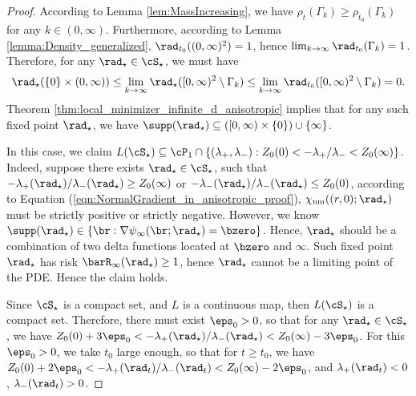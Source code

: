 \documentclass[11pt]{article}
\begin{document}
\begin{proof}
According to Lemma \ref{lem:MassIncreasing}, we have $\rho_t(\Gamma_k) \ge \rho_{t_0}(\Gamma_k)$ for any $k \in (0, \infty)$. Furthermore, according to Lemma \ref{lemma:Density_generalized}, $\rad_{t_0}((0, \infty)^2) = 1$, hence $\lim_{k \to \infty} \rad_{t_0}(\Gamma_k) = 1$. Therefore, for any $\rad_\star \in \cS_\star$, we must have 
\begin{equation}
\rad_\star(\{ 0 \} \times (0, \infty)) \le \lim_{k \to \infty} \rad_\star([0, \infty)^2 \setminus \Gamma_k) \le \lim_{k \to \infty}\rad_{t_0}([0, \infty)^2 \setminus \Gamma_k )= 0. 
\end{equation}
Theorem \ref{thm:local_minimizer_infinite_d_anisotropic} implies that for any such fixed point $\rad_\star$, we have $\supp(\rad_\star) \subseteq ([0, \infty) \times \{0\}) \cup \{\infty\}$.  

In this case, we claim $L(\cS_\star) \subseteq \cP_1 \cap \{(\lambda_+, \lambda_-) : Z_0(0) < - \lambda_+ / \lambda_- < Z_0(\infty)\}$. Indeed, suppose there exists $\rad_\star \in \cS_\star$, such that $-\lambda_+(\rad_\star)/\lambda_-(\rad_\star) \ge Z_0(\infty)$ or $-\lambda_-(\rad_\star)/\lambda_-(\rad_\star) \le Z_0(0)$, according to Equation (\ref{eqn:NormalGradient_in_anisotropic_proof}), $\chi_{\rm nm}((r, 0); \rad_\star)$ must be strictly positive or strictly negative. However, we know $\supp(\rad_\star) \in \{\br: \nabla \psi_\infty(\br; \rad_\star) = \bzero \}$.  Hence, $\rad_\star$ should be a combination of two delta functions located at $\bzero$ and $\infty$. Such fixed point $\rad_\star$ has risk $\barR_\infty(\rad_\star) \ge 1$, hence $\rad_\star$ cannot be a limiting point of the PDE. Hence the claim holds.

Since $\cS_\star$ is a compact set, and $L$ is a continuous map, then $L(\cS_\star)$ is a compact set. Therefore, there must exist $\eps_0 > 0$, so that for any $\rad_\star \in \cS_\star$, we have $Z_0(0) + 3\eps_0 < -\lambda_+(\rad_\star) / \lambda_-(\rad_\star) < Z_0(\infty) - 3\eps_0$. For this $\eps_0 > 0$, we take $t_0$ large enough, so that for $t \ge t_0$, we have $Z_0(0) + 2\eps_0 < - \lambda_+(\rad_t) / \lambda_-(\rad_t) < Z_0(\infty) - 2\eps_0$, and $\lambda_+(\rad_t) < 0$, $\lambda_-(\rad_t) > 0$. 


\end{proof}
\end{document}
